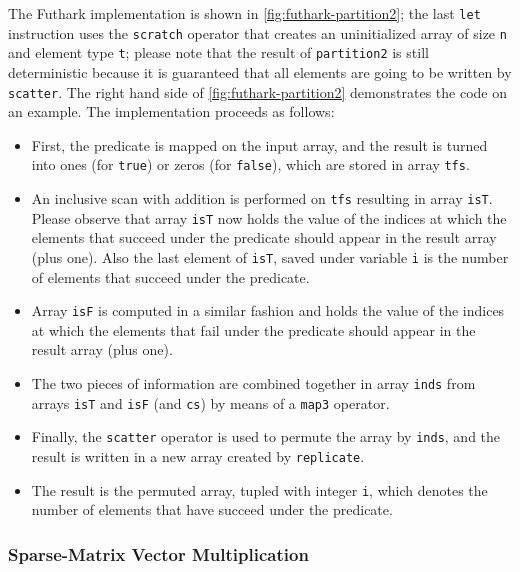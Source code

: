 \documentclass[acmsmall,review]{acmart}\settopmatter{printfolios=true,printccs=false,printacmref=false}
\begin{document}
The Futhark implementation is shown in \cref{fig:futhark-partition2};
the last {\tt let} instruction uses the {\tt scratch} operator
that creates an uninitialized array of size {\tt n} and element
type {\tt t}; please note that the result of {\tt partition2} is 
still deterministic because it is guaranteed that all elements
are going to be written by \lstinline{scatter}. 
%
The right hand  side of \cref{fig:futhark-partition2} demonstrates
the code on an example. The implementation proceeds as follows:
\begin{itemize}
    \item First, the predicate is mapped on the input array,
            and the result is turned into ones (for \lstinline{true})
            or zeros (for \lstinline{false}), which are stored in
            array {\tt tfs}.
    \item An inclusive scan with addition is performed on {\tt tfs}
            resulting in array {\tt isT}. Please observe that 
            array {\tt isT} now holds the value of the indices at 
            which the elements that succeed under the predicate
            should appear in the result array (plus one). Also
            the last element of {\tt isT}, saved under variable 
            {\tt i} is the number of elements that succeed under 
            the predicate.
    \item Array {\tt isF} is computed in a similar fashion and
            holds the value of the indices at which the elements 
            that fail under the predicate
            should appear in the result array (plus one).
    \item The two pieces of information are combined together
            in array {\tt inds} from arrays {\tt isT} and {\tt isF}
            (and {\tt cs}) by means of a \lstinline{map3} operator.
    \item Finally, the \lstinline{scatter} operator is used to
            permute the array by {\tt inds}, and the result is
            written in a new array created by \lstinline{replicate}.
    \item The result is the permuted array, tupled with integer {\tt i},
            which denotes the number of elements that have succeed 
            under the predicate.
\end{itemize}


\subsubsection{Sparse-Matrix Vector Multiplication}
\label{subsubsub:sparse-mat-vec-mult}
$\mbox{ }$\\
\end{document}
